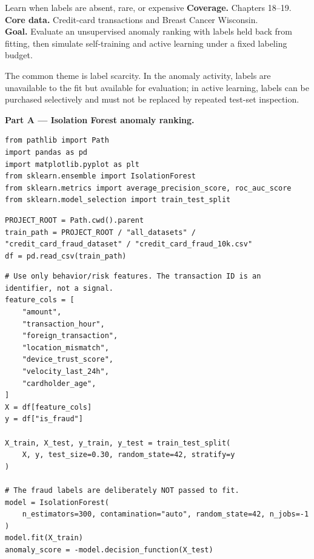 
\begin{labproject}{Learn when labels are absent, rare, or expensive}
\textbf{Coverage.} Chapters 18--19.\\
\textbf{Core data.} Credit-card transactions and Breast Cancer Wisconsin.\\
\textbf{Goal.} Evaluate an unsupervised anomaly ranking with labels held back from fitting, then simulate self-training and active learning under a fixed labeling budget.

\begin{labmode}
The common theme is label scarcity. In the anomaly activity, labels are unavailable to the fit but available for evaluation; in active learning, labels can be purchased selectively and must not be replaced by repeated test-set inspection.
\end{labmode}

\medskip\noindent\textbf{Part A --- Isolation Forest anomaly ranking.}\par
\begin{lstlisting}[style=mlpython]
from pathlib import Path
import pandas as pd
import matplotlib.pyplot as plt
from sklearn.ensemble import IsolationForest
from sklearn.metrics import average_precision_score, roc_auc_score
from sklearn.model_selection import train_test_split
\end{lstlisting}

\begin{lstlisting}[style=mlpython]
PROJECT_ROOT = Path.cwd().parent
train_path = PROJECT_ROOT / "all_datasets" / "credit_card_fraud_dataset" / "credit_card_fraud_10k.csv"
df = pd.read_csv(train_path)
\end{lstlisting}

\begin{lstlisting}[style=mlpython]
# Use only behavior/risk features. The transaction ID is an identifier, not a signal.
feature_cols = [
    "amount",
    "transaction_hour",
    "foreign_transaction",
    "location_mismatch",
    "device_trust_score",
    "velocity_last_24h",
    "cardholder_age",
]
X = df[feature_cols]
y = df["is_fraud"]

X_train, X_test, y_train, y_test = train_test_split(
    X, y, test_size=0.30, random_state=42, stratify=y
)

# The fraud labels are deliberately NOT passed to fit.
model = IsolationForest(
    n_estimators=300, contamination="auto", random_state=42, n_jobs=-1
)
model.fit(X_train)
anomaly_score = -model.decision_function(X_test)


\end{lstlisting}
\end{labproject}
